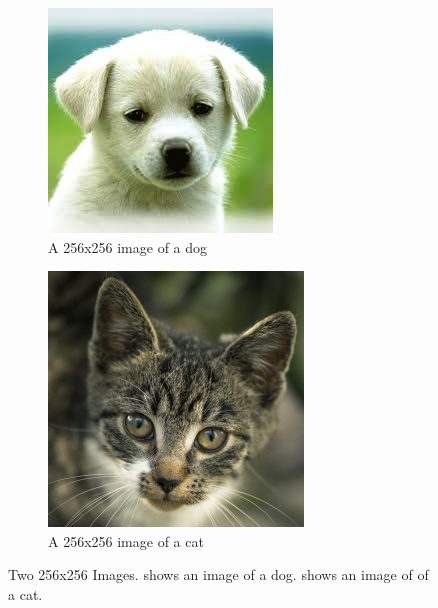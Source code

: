 \documentclass{l4proj}
\begin{document}
\begin{figure}[!h]
    \centering
    \begin{subfigure}[b]{0.4\textwidth}
        \includegraphics[width=\textwidth]{images/dog.jpg}
        \caption{A 256x256 image of a dog}
        \label{fig:dog_image}
    \end{subfigure}
    \begin{subfigure}[b]{0.4\textwidth}
        \includegraphics[width=\textwidth]{images/cat.jpg}
        \caption{A 256x256 image of a cat}
        \label{fig:cat_image}
    \end{subfigure}
    \caption{Two 256x256 Images.  shows an image of a dog.  shows an image of of a cat.}
\end{figure}
\end{document}
